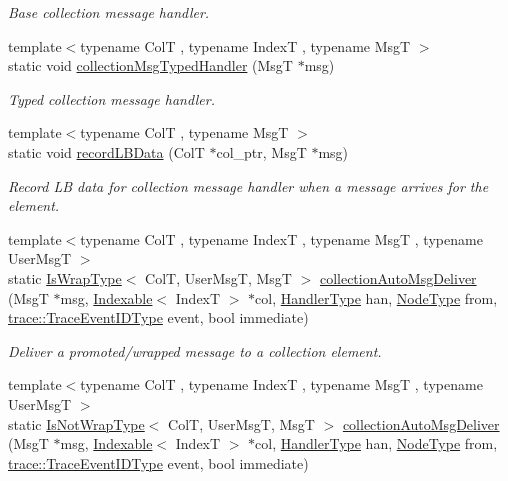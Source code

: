 \begin{DoxyCompactItemize}
\begin{DoxyCompactList}\small\item\em Base collection message handler. \end{DoxyCompactList}\item 
{\footnotesize template$<$typename ColT , typename IndexT , typename MsgT $>$ }\\static void \hyperlink{structvt_1_1vrt_1_1collection_1_1_collection_manager_a7bb443544c8c4b94a7a10a0ec8126018}{collection\+Msg\+Typed\+Handler} (MsgT $\ast$msg)
\begin{DoxyCompactList}\small\item\em Typed collection message handler. \end{DoxyCompactList}\item 
{\footnotesize template$<$typename ColT , typename MsgT $>$ }\\static void \hyperlink{structvt_1_1vrt_1_1collection_1_1_collection_manager_a530e4c24e204a0a97317e1245a09d54c}{record\+L\+B\+Data} (ColT $\ast$col\+\_\+ptr, MsgT $\ast$msg)
\begin{DoxyCompactList}\small\item\em Record LB data for collection message handler when a message arrives for the element. \end{DoxyCompactList}\item 
{\footnotesize template$<$typename ColT , typename IndexT , typename MsgT , typename User\+MsgT $>$ }\\static \hyperlink{structvt_1_1vrt_1_1collection_1_1_collection_manager_a1f91c97ed52237c3a3576dfbbe87c8f8}{Is\+Wrap\+Type}$<$ ColT, User\+MsgT, MsgT $>$ \hyperlink{structvt_1_1vrt_1_1collection_1_1_collection_manager_ad669125b8bb004b69497d296f10c8a56}{collection\+Auto\+Msg\+Deliver} (MsgT $\ast$msg, \hyperlink{structvt_1_1vrt_1_1collection_1_1_indexable}{Indexable}$<$ IndexT $>$ $\ast$col, \hyperlink{namespacevt_af64846b57dfcaf104da3ef6967917573}{Handler\+Type} han, \hyperlink{namespacevt_a866da9d0efc19c0a1ce79e9e492f47e2}{Node\+Type} from, \hyperlink{namespacevt_1_1trace_a64a7185f3e102df8d8258f263ccd1582}{trace\+::\+Trace\+Event\+I\+D\+Type} event, bool immediate)
\begin{DoxyCompactList}\small\item\em Deliver a promoted/wrapped message to a collection element. \end{DoxyCompactList}\item 
{\footnotesize template$<$typename ColT , typename IndexT , typename MsgT , typename User\+MsgT $>$ }\\static \hyperlink{structvt_1_1vrt_1_1collection_1_1_collection_manager_a18e3a17d9eb086c6c2f499242b7faa1e}{Is\+Not\+Wrap\+Type}$<$ ColT, User\+MsgT, MsgT $>$ \hyperlink{structvt_1_1vrt_1_1collection_1_1_collection_manager_a74ddc2d783760a0716167291bac6d7f4}{collection\+Auto\+Msg\+Deliver} (MsgT $\ast$msg, \hyperlink{structvt_1_1vrt_1_1collection_1_1_indexable}{Indexable}$<$ IndexT $>$ $\ast$col, \hyperlink{namespacevt_af64846b57dfcaf104da3ef6967917573}{Handler\+Type} han, \hyperlink{namespacevt_a866da9d0efc19c0a1ce79e9e492f47e2}{Node\+Type} from, \hyperlink{namespacevt_1_1trace_a64a7185f3e102df8d8258f263ccd1582}{trace\+::\+Trace\+Event\+I\+D\+Type} event, bool immediate)

\end{DoxyCompactItemize}
